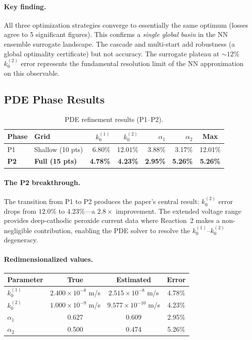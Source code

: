\documentclass[11pt,a4paper]{article}
\newcommand{\kzero}{k_0}
\begin{document}
\paragraph{Key finding.}
All three optimization strategies converge to essentially the same
optimum (losses agree to 5 significant figures). This confirms a
\emph{single global basin} in the NN ensemble surrogate landscape.
The cascade and multi-start add robustness (a global optimality
certificate) but not accuracy. The surrogate plateau at
$\sim\!12\%$ $\kzero^{(2)}$ error represents the fundamental resolution
limit of the NN approximation on this observable.

\subsection{PDE Phase Results}\label{sec:pde_results}

\begin{table}[H]
\centering
\caption{PDE refinement results (P1--P2).}
\label{tab:pde_results}
\begin{tabular}{llrrrrc}
\toprule
Phase & Grid & $\kzero^{(1)}$ & $\kzero^{(2)}$ & $\alpha_1$ & $\alpha_2$ & Max \\
\midrule
P1 & Shallow (10 pts) & 6.80\% & 12.01\% & 3.88\% & 3.17\% & 12.01\% \\
\textbf{P2} & \textbf{Full (15 pts)} & \textbf{4.78\%} & \textbf{4.23\%}
  & \textbf{2.95\%} & \textbf{5.26\%} & \textbf{5.26\%} \\
\bottomrule
\end{tabular}
\end{table}

\paragraph{The P2 breakthrough.}
The transition from P1 to P2 produces the paper's central result:
$\kzero^{(2)}$ error drops from $12.0\%$ to $4.23\%$---a $2.8\times$
improvement. The extended voltage range provides deep-cathodic peroxide
current data where Reaction~2 makes a non-negligible contribution,
enabling the PDE solver to resolve the $\kzero^{(1)}$--$\kzero^{(2)}$
degeneracy.

\paragraph{Redimensionalized values.}
\begin{center}
\begin{tabular}{lccc}
\toprule
Parameter & True & Estimated & Error \\
\midrule
$\kzero^{(1)}$ & $2.400\times10^{-8}$ m/s & $2.515\times10^{-8}$ m/s & 4.78\% \\
$\kzero^{(2)}$ & $1.000\times10^{-9}$ m/s & $9.577\times10^{-10}$ m/s & 4.23\% \\
$\alpha_1$ & 0.627 & 0.609 & 2.95\% \\
$\alpha_2$ & 0.500 & 0.474 & 5.26\% \\
\bottomrule
\end{tabular}
\end{center}
\end{document}
